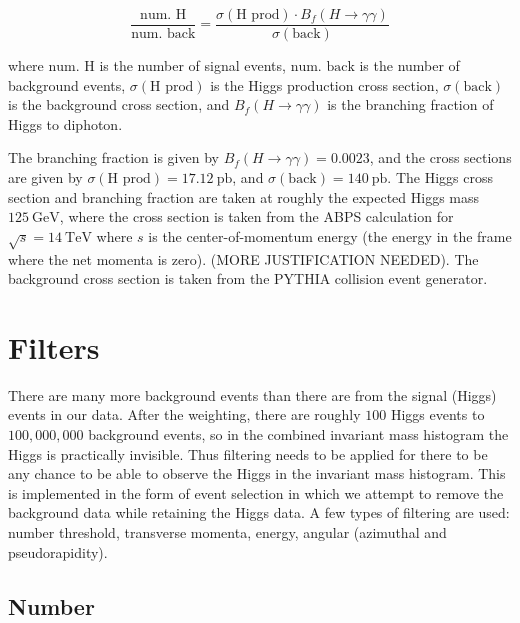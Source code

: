 \documentclass[11pt]{amsart}
\begin{document}
\begin{multicols}{2}
\begin{equation}
  \label{eq:weighting}
  \frac{\text{num. H}}{\text{num. back}} = \frac{\sigma{\left(\text{H prod}\right)} \cdot B_f\left(H\to\gamma\gamma\right)}{\sigma{\left(\text{back}\right)}}
\end{equation}

where $\text{num. H}$ is the number of signal events, $\text{num. back}$ is the number of background events, $\sigma{\left(\text{H prod}\right)}$ is the Higgs production cross section, $\sigma{\left(\text{back}\right)}$ is the background cross section, and $B_f\left(H\to\gamma\gamma\right)$ is the branching fraction of Higgs to diphoton.

The branching fraction is given by $B_f\left(H\to\gamma\gamma\right) = 0.0023$, and the cross sections are given by $\sigma{\left(\text{H prod}\right)} = \SI{17.12}{\pico\barn}$, and $\sigma{\left(\text{back}\right)} = \SI{140}{\pico\barn}$. The Higgs cross section and branching fraction are taken at roughly the expected Higgs mass $\SI{125}{\giga\electronvolt}$, \cite{Higgs} where the cross section is taken from the ABPS calculation for $\sqrt{s} = \SI{14}{\tera\electronvolt}$ where $s$ is the center-of-momentum energy (the energy in the frame where the net momenta is zero). \cite{HiggsCross1} (MORE JUSTIFICATION NEEDED). The background cross section is taken from the PYTHIA collision event generator.


\section{Filters}
\label{sec:filters}

There are many more background events than there are from the signal (Higgs) events in our data. After the weighting, there are roughly $100$ Higgs events to $100,000,000$ background events, so in the combined invariant mass histogram the Higgs is practically invisible. Thus filtering needs to be applied for there to be any chance to be able to observe the Higgs in the invariant mass histogram. This is implemented in the form of event selection in which we attempt to remove the background data while retaining the Higgs data. A few types of filtering are used: number threshold, transverse momenta, energy, angular (azimuthal and pseudorapidity).

\subsection{Number}


\end{multicols}
\end{document}
